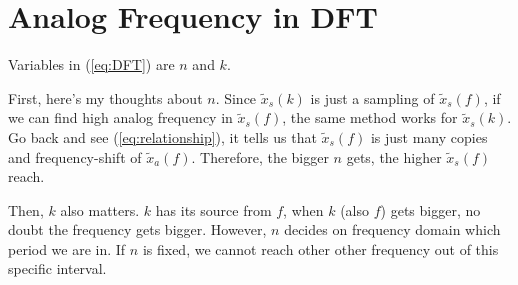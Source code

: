 \documentclass{article}
\begin{document}
\section{Analog Frequency in DFT}
Variables in (\ref{eq:DFT}) are $n$ and $k$.

First, here's my thoughts about $n$. Since $\widetilde{x}_s(k)$ is just a sampling of $\widetilde{x}_s(f)$, if we can find high analog frequency in $\widetilde{x}_s(f)$, the same method works for $\widetilde{x}_s(k)$. Go back and see (\ref{eq:relationship}), it tells us that $\widetilde{x}_s(f)$ is just many copies and frequency-shift of $\widetilde{x}_a(f)$. Therefore, the bigger $n$ gets, the higher $\widetilde{x}_s(f)$ reach. 

Then, $k$ also matters. $k$ has its source from $f$, when $k$ (also $f$) gets bigger, no doubt the frequency gets bigger. However, $n$ decides on frequency domain which period we are in. If $n$ is fixed, we cannot reach other other frequency out of this specific interval.  




% 
% 


\end{document}
